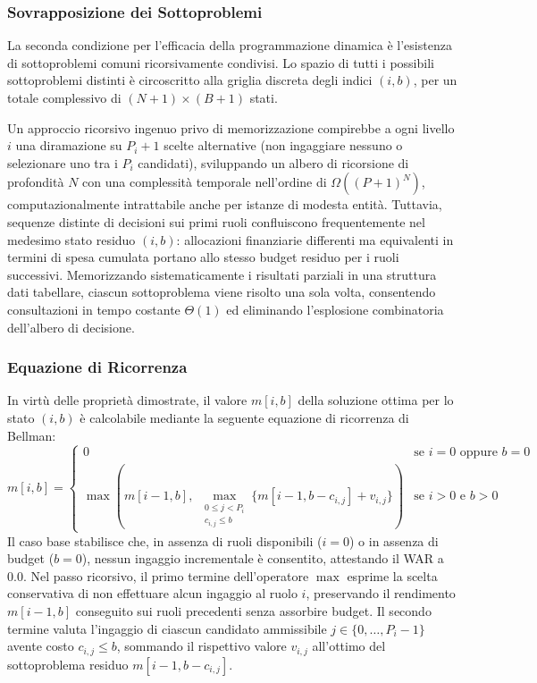 \subsubsection{Sovrapposizione dei Sottoproblemi}
La seconda condizione per l'efficacia della programmazione dinamica è l'esistenza di sottoproblemi comuni ricorsivamente condivisi. Lo spazio di tutti i possibili sottoproblemi distinti è circoscritto alla griglia discreta degli indici $(i, b)$, per un totale complessivo di $(N + 1) \times (B + 1)$ stati.

Un approccio ricorsivo ingenuo privo di memorizzazione compirebbe a ogni livello $i$ una diramazione su $P_i + 1$ scelte alternative (non ingaggiare nessuno o selezionare uno tra i $P_i$ candidati), sviluppando un albero di ricorsione di profondità $N$ con una complessità temporale nell'ordine di $\Omega((P + 1)^N)$, computazionalmente intrattabile anche per istanze di modesta entità. Tuttavia, sequenze distinte di decisioni sui primi ruoli confluiscono frequentemente nel medesimo stato residuo $(i, b)$: allocazioni finanziarie differenti ma equivalenti in termini di spesa cumulata portano allo stesso budget residuo per i ruoli successivi. Memorizzando sistematicamente i risultati parziali in una struttura dati tabellare, ciascun sottoproblema viene risolto una sola volta, consentendo consultazioni in tempo costante $\Theta(1)$ ed eliminando l'esplosione combinatoria dell'albero di decisione.

\subsubsection{Equazione di Ricorrenza}
In virtù delle proprietà dimostrate, il valore $m[i, b]$ della soluzione ottima per lo stato $(i, b)$ è calcolabile mediante la seguente equazione di ricorrenza di Bellman:
\begin{equation}
	m[i, b] = \begin{cases}
		0 & \text{se } i = 0 \text{ oppure } b = 0                       \\
		\max \left( m[i - 1, b], \; \max\limits_{\substack{0 \le j < P_i \\ c_{i, j} \le b}} \{ m[i - 1, b - c_{i, j}] + v_{i, j} \} \right) & \text{se } i > 0 \text{ e } b > 0
	\end{cases}
	\label{eq:bellman}
\end{equation}
Il caso base stabilisce che, in assenza di ruoli disponibili ($i = 0$) o in assenza di budget ($b = 0$), nessun ingaggio incrementale è consentito, attestando il WAR a $0.0$. Nel passo ricorsivo, il primo termine dell'operatore $\max$ esprime la scelta conservativa di non effettuare alcun ingaggio al ruolo $i$, preservando il rendimento $m[i-1, b]$ conseguito sui ruoli precedenti senza assorbire budget. Il secondo termine valuta l'ingaggio di ciascun candidato ammissibile $j \in \{0, \dots, P_i - 1\}$ avente costo $c_{i,j} \le b$, sommando il rispettivo valore $v_{i, j}$ all'ottimo del sottoproblema residuo $m[i - 1, b - c_{i, j}]$.

